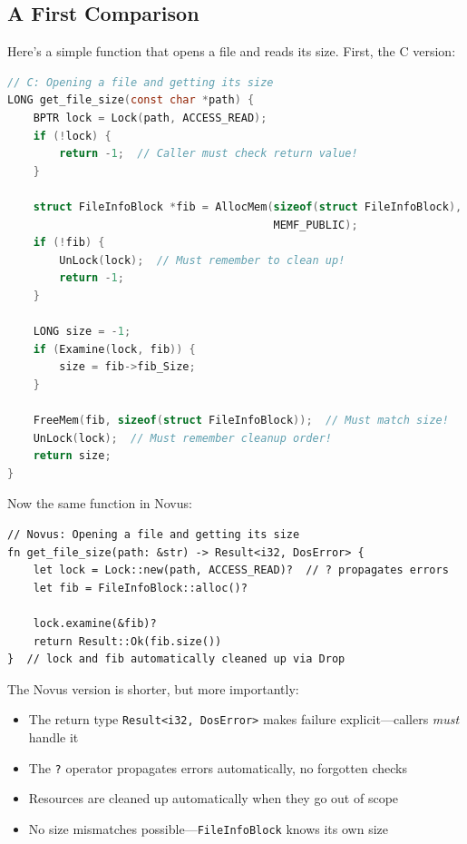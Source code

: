 \subsection{A First Comparison}

Here's a simple function that opens a file and reads its size. First, the C version:

\begin{lstlisting}[language=C]
// C: Opening a file and getting its size
LONG get_file_size(const char *path) {
    BPTR lock = Lock(path, ACCESS_READ);
    if (!lock) {
        return -1;  // Caller must check return value!
    }

    struct FileInfoBlock *fib = AllocMem(sizeof(struct FileInfoBlock),
                                         MEMF_PUBLIC);
    if (!fib) {
        UnLock(lock);  // Must remember to clean up!
        return -1;
    }

    LONG size = -1;
    if (Examine(lock, fib)) {
        size = fib->fib_Size;
    }

    FreeMem(fib, sizeof(struct FileInfoBlock));  // Must match size!
    UnLock(lock);  // Must remember cleanup order!
    return size;
}
\end{lstlisting}

Now the same function in Novus:

\begin{lstlisting}
// Novus: Opening a file and getting its size
fn get_file_size(path: &str) -> Result<i32, DosError> {
    let lock = Lock::new(path, ACCESS_READ)?  // ? propagates errors
    let fib = FileInfoBlock::alloc()?

    lock.examine(&fib)?
    return Result::Ok(fib.size())
}  // lock and fib automatically cleaned up via Drop
\end{lstlisting}

The Novus version is shorter, but more importantly:

\begin{itemize}
    \item The return type \texttt{Result<i32, DosError>} makes failure explicit---callers \emph{must} handle it
    \item The \texttt{?} operator propagates errors automatically, no forgotten checks
    \item Resources are cleaned up automatically when they go out of scope
    \item No size mismatches possible---\texttt{FileInfoBlock} knows its own size
\end{itemize}

